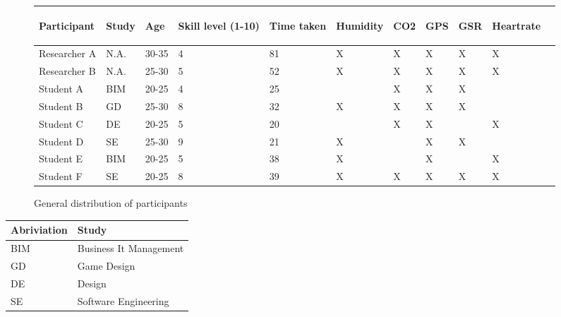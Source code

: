 \documentclass[conference]{IEEEtran}
\begin{document}
		\begin{figure*}[ht]
			\centering
			\begin{tabular}{ | l | l | l | l | l | l | l | l | l | l | l }
				\hline
					\begin{turn}{-90}Participant\end{turn}			&
					\begin{turn}{-90}Study\end{turn}				&
					\begin{turn}{-90}Age\end{turn}					&
					\begin{turn}{-90}Skill level (1-10)\end{turn}	&
					\begin{turn}{-90}Time taken\end{turn}			&
					\begin{turn}{-90}Humidity\end{turn}			&
					\begin{turn}{-90}CO2\end{turn}					&
					\begin{turn}{-90}GPS\end{turn}					&
					\begin{turn}{-90}GSR\end{turn}					&
					\begin{turn}{-90}Heartrate\end{turn}			
					\\ \hline \hline
			
			
			Researcher A	& N.A.			& 30-35 & 4		& 81	& X	& X	& X	& X	& X	\\ \hline
			Researcher B	& N.A.			& 25-30 & 5 	& 52	& X	& X	& X	& X	& X	\\ \hline
			Student A		& BIM			& 20-25 & 4 	& 25	& 	& X	& X	& X	& 	\\ \hline
			Student B		& GD 			& 25-30 & 8 	& 32	& X	& X	& X	& X	&	\\ \hline
			Student C		& DE			& 20-25 & 5		& 20	& 	& X	& X	&	& X	\\ \hline
			Student D		& SE 			& 25-30	& 9		& 21	& X	& 	& X	& X	&	\\ \hline
			Student E		& BIM		 	& 20-25	& 5 	& 38	& X	&	& X	&	& X	\\ \hline
			Student F		& SE 			& 20-25	& 8		& 39	& X	& X	& X	& X	& X	\\ \hline
			\end{tabular}
			\caption{General distribution of participants}
		\end{figure*}
		\begin{tabular}{ | l | l | }
			\hline
			Abriviation & Study 					\\ \hline \hline
			BIM			& Business It Management	\\ \hline
			GD			& Game Design				\\ \hline
			DE			& Design					\\ \hline
			SE			& Software Engineering		\\ \hline
		
		\end{tabular}
\end{document}
